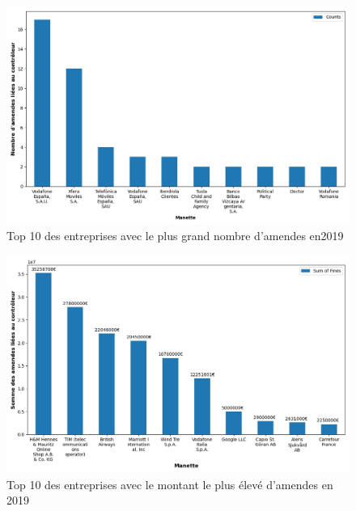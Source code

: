 \documentclass[french]{article}
\begin{document}
\newpage

	
	\begin{multicols}{2}
	\begin{figure}
		[H]\centering\includegraphics[width=1.0\linewidth]{graphs/top10_controller_year}
		\caption{Top 10 des entreprises avec le plus grand nombre d'amendes en2019}
	\end{figure}
	\begin{figure}
		[H]\centering\includegraphics[width=1\linewidth]{graphs/top10_controller_year_fines}
		\caption{Top 10 des entreprises avec le montant le plus élevé d'amendes en 2019}
	 \end{figure}
	
	\end{multicols}
\end{document}
